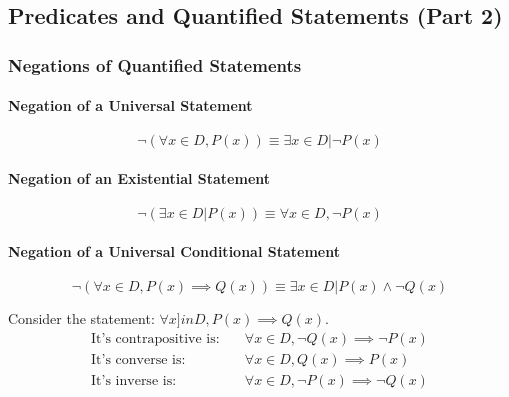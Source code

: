 \subsection{Predicates and Quantified Statements (Part 2)}
\hrulefill

\subsubsection*{Negations of Quantified Statements}
\paragraph*{Negation of a Universal Statement}
\begin{equation*}
    \neg(\forall x \in D, P(x)) \equiv \exists x \in D | \neg P(x)
\end{equation*}

\paragraph*{Negation of an Existential Statement}
\begin{equation*}
    \neg(\exists x \in D | P(x)) \equiv \forall x \in D, \neg P(x)
\end{equation*}

\paragraph*{Negation of a Universal Conditional Statement}
\begin{equation*}
    \neg(\forall x \in D, P(x) \implies Q(x)) \equiv \exists x \in D | P(x) \land \neg Q(x)
\end{equation*}

Consider the statement: $\forall x ]in D, P(x) \implies Q(x)$.
\begin{align*}
    \text{It's contrapositive is:} \quad &\forall x \in D, \neg Q(x) \implies \neg P(x)\\
    \text{It's converse is:} \quad &\forall x \in D, Q(x) \implies P(x)\\
    \text{It's inverse is:} \quad &\forall x \in D, \neg P(x) \implies \neg Q(x)
\end{align*}